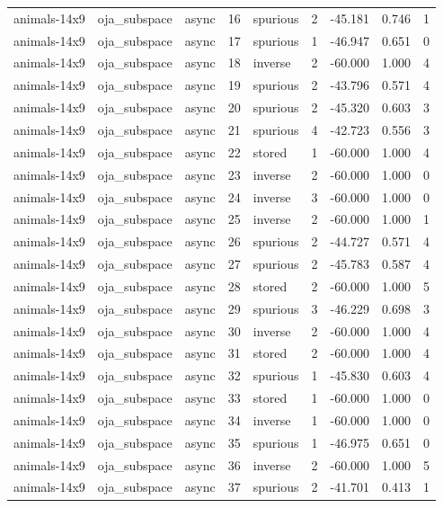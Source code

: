 \begin{tabular}{lllrlrrrr}
animals-14x9 & oja\_subspace & async & 16 & spurious & 2 & -45.181 & 0.746 & 1 \\
animals-14x9 & oja\_subspace & async & 17 & spurious & 1 & -46.947 & 0.651 & 0 \\
animals-14x9 & oja\_subspace & async & 18 & inverse & 2 & -60.000 & 1.000 & 4 \\
animals-14x9 & oja\_subspace & async & 19 & spurious & 2 & -43.796 & 0.571 & 4 \\
animals-14x9 & oja\_subspace & async & 20 & spurious & 2 & -45.320 & 0.603 & 3 \\
animals-14x9 & oja\_subspace & async & 21 & spurious & 4 & -42.723 & 0.556 & 3 \\
animals-14x9 & oja\_subspace & async & 22 & stored & 1 & -60.000 & 1.000 & 4 \\
animals-14x9 & oja\_subspace & async & 23 & inverse & 2 & -60.000 & 1.000 & 0 \\
animals-14x9 & oja\_subspace & async & 24 & inverse & 3 & -60.000 & 1.000 & 0 \\
animals-14x9 & oja\_subspace & async & 25 & inverse & 2 & -60.000 & 1.000 & 1 \\
animals-14x9 & oja\_subspace & async & 26 & spurious & 2 & -44.727 & 0.571 & 4 \\
animals-14x9 & oja\_subspace & async & 27 & spurious & 2 & -45.783 & 0.587 & 4 \\
animals-14x9 & oja\_subspace & async & 28 & stored & 2 & -60.000 & 1.000 & 5 \\
animals-14x9 & oja\_subspace & async & 29 & spurious & 3 & -46.229 & 0.698 & 3 \\
animals-14x9 & oja\_subspace & async & 30 & inverse & 2 & -60.000 & 1.000 & 4 \\
animals-14x9 & oja\_subspace & async & 31 & stored & 2 & -60.000 & 1.000 & 4 \\
animals-14x9 & oja\_subspace & async & 32 & spurious & 1 & -45.830 & 0.603 & 4 \\
animals-14x9 & oja\_subspace & async & 33 & stored & 1 & -60.000 & 1.000 & 0 \\
animals-14x9 & oja\_subspace & async & 34 & inverse & 1 & -60.000 & 1.000 & 0 \\
animals-14x9 & oja\_subspace & async & 35 & spurious & 1 & -46.975 & 0.651 & 0 \\
animals-14x9 & oja\_subspace & async & 36 & inverse & 2 & -60.000 & 1.000 & 5 \\
animals-14x9 & oja\_subspace & async & 37 & spurious & 2 & -41.701 & 0.413 & 1 \\

\end{tabular}

